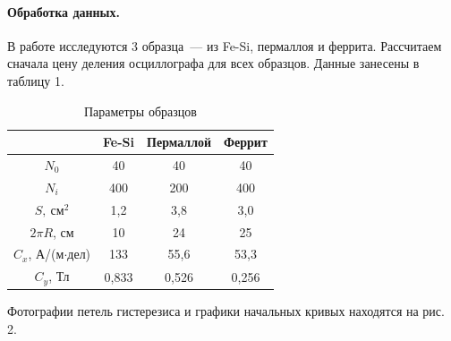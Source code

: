 \documentclass[12pt,a4paper]{article}
\begin{document}
\paragraph{Обработка данных.} В работе исследуются 3 образца~--- из Fe-Si, пермаллоя и феррита. Рассчитаем сначала цену деления осциллографа для всех образцов. Данные занесены в таблицу 1.

\begin{table}[h]\centering
\begin{tabular}{c|c|c|c|}
~&Fe-Si&Пермаллой&Феррит\\
\hline
$N_0$&40&40&40\\
\hline
$N_i$&400&200&400\\
\hline
$S,~\text{см}^2$&1,2&3,8&3,0\\
\hline
$2\pi R$, см&10&24&25\\
\hline
$C_x$, А/(м$\cdot$дел)&133&55,6&53,3\\
\hline
$C_y$, Тл&0,833&0,526&0,256\\
\hline
\end{tabular}
\caption{Параметры образцов}
\end{table}
\newpage
Фотографии петель гистерезиса и графики начальных кривых находятся на рис. 2. 
\end{document}
